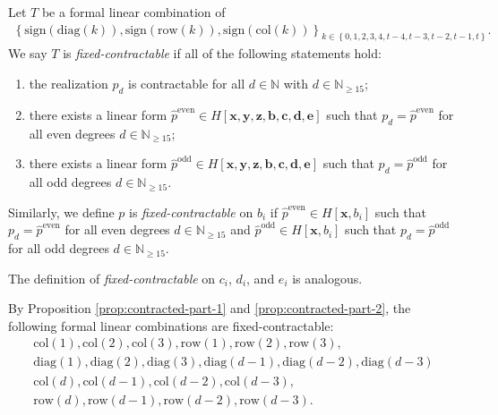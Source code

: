 \begin{definition}
    Let \( T \) be a formal linear combination of
    \begin{align*}
        \left\{ \mathrm{sign}(\mathrm{diag}(k)), \mathrm{sign}(\mathrm{row}(k)), \mathrm{sign}(\mathrm{col}(k)) \right\}_{k \in \left\{ 0,1,2,3,4,t-4,t-3,t-2,t-1,t \right\}}.
    \end{align*}
    We say \( T \) is \emph{fixed-contractable} if all of the following statements hold:
    \begin{enumerate}
        \item the realization \( p_d \) is contractable for all \( d \in \mathbb{N} \) with \( d \in \mathbb{N}_{\geq 15} \);
        \item there exists a linear form \( \hat p^{\mathrm{even}} \in H[\mathbf{x}, \mathbf{y}, \mathbf{z}, \mathbf{b}, \mathbf{c}, \mathbf{d}, \mathbf{e}] \) such that \( p_d = \hat p^{\mathrm{even}} \) for all even degrees \(  d \in \mathbb{N}_{\geq 15}  \);
        \item there exists a linear form \( \hat p^{\mathrm{odd}} \in H[\mathbf{x}, \mathbf{y}, \mathbf{z}, \mathbf{b}, \mathbf{c}, \mathbf{d}, \mathbf{e}] \) such that \( p_d = \hat p^{\mathrm{odd}} \) for all odd degrees \(  d \in \mathbb{N}_{\geq 15}  \).
    \end{enumerate}
    
    Similarly, we define \( p \) is \emph{fixed-contractable} on \( b_i \) if \( \hat p^{\mathrm{even}} \in H[\mathbf{x}, b_i] \) such that \( p_d = \hat p^{\mathrm{even}} \) for all even degrees \(  d \in \mathbb{N}_{\geq 15}  \) and \( \hat p^{\mathrm{odd}} \in H[\mathbf{x}, b_i] \) such that \( p_d = \hat p^{\mathrm{odd}} \) for all odd degrees \(  d \in \mathbb{N}_{\geq 15}  \). 
    
    The definition of \emph{fixed-contractable} on \( c_i \), \( d_i \), and \( e_i \) is analogous.
\end{definition}

\begin{example}
    By Proposition \ref{prop:contracted-part-1} and \ref{prop:contracted-part-2}, the following formal linear combinations are fixed-contractable:
    \begin{gather*}
        \mathrm{col}(1), \mathrm{col}(2), \mathrm{col}(3), \mathrm{row}(1), \mathrm{row}(2), \mathrm{row}(3), \\
        \mathrm{diag}(1), \mathrm{diag}(2), \mathrm{diag}(3), \mathrm{diag}(d-1), \mathrm{diag}(d-2), \mathrm{diag}(d-3) \\
        \mathrm{col}(d), \mathrm{col}(d-1), \mathrm{col}(d-2), \mathrm{col}(d-3),  \\\mathrm{row}(d), \mathrm{row}(d-1), \mathrm{row}(d-2), \mathrm{row}(d-3).
    \end{gather*}
\end{example}

